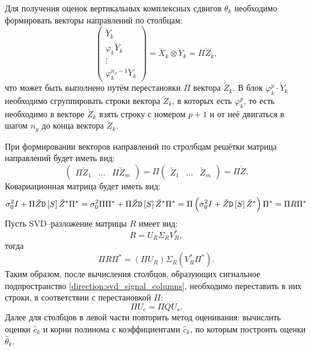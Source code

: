 Для получения оценок вертикальных комплексных сдвигов $\theta_k$ необходимо формировать векторы направлений по столбцам:
\[
    \begin{pmatrix}
        \breve{Y}_k           \\
        \varphi_k \breve{Y}_k \\
        \vdots                \\
        \varphi_k^{n_x-1} \breve{Y}_k
    \end{pmatrix}
    = \breve{X}_k \otimes \breve{Y}_k
    = \Pi \breve{Z}_k ,
\]
что может быть выполнено путём перестановки $\Pi$ вектора $\breve{Z}_k$. В блок $\varphi_k^p \cdot \breve{Y}_k$ необходимо сгруппировать строки вектора
$\breve{Z}_k$, в которых есть $\varphi_k^p$, то есть необходимо в векторе $\breve{Z}_k$ взять строку с номером $p+1$ и от неё двигаться в шагом $n_y$ до
конца вектора $\breve{Z}_k$.

При формировании векторов направлений по стролбцам решётки матрица направлений будет иметь вид:
\[
    \begin{pmatrix}
        \Pi \breve{Z}_1 & \dots & \Pi \breve{Z}_m
    \end{pmatrix}
    = \Pi \begin{pmatrix}
        \breve{Z}_1 & \dots & \breve{Z}_m
    \end{pmatrix}
    = \Pi \breve{Z} .
\]
Ковариационная матрица будет иметь вид:
\[
    \sigma_0^2 I + \Pi \breve{Z} \mathtt{D} \left[ S \right] \breve{Z}^* \Pi^*
    = \sigma_0^2 \Pi \Pi^* + \Pi \breve{Z} \mathtt{D} \left[ S \right] \breve{Z}^* \Pi^*
    = \Pi \left( \sigma_0^2 I + \breve{Z} \mathtt{D} \left[ S \right] \breve{Z}^* \right) \Pi^*
    = \Pi R \Pi^*
\]
Пусть SVD--разложение матрицы $R$ имеет вид:
\[
    R = U_R \Sigma_R V_R^* ,
\]
тогда
\[
    \Pi R \Pi^*
    = \left( \Pi U_R \right) \Sigma_R \left(V_R^* \Pi^* \right) .
\]
Таким образом, после вычисления столбцов, образующих сигнальное подпространство \eqref{direction:svd_signal_columns}, необходимо переставить в них строки,
в соответствии с перестановкой $\Pi$:
\[
    \Pi U_c = \Pi Q U_s .
\]
Далее для столбцов в левой части повторить метод оценивания: вычислить оценки $\widehat{c}_k$ и корни полинома с коэффициентами $\widehat{c}_k$, по которым
построить оценки $\widehat{\theta}_k$.